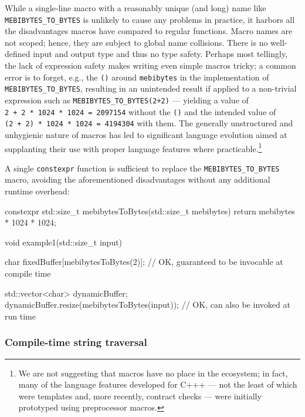 \noindent While a single-line macro with a reasonably unique (and long) name like
\lstinline!MEBIBYTES_TO_BYTES! is unlikely to cause any problems in
practice, it harbors all the disadvantages macros have compared to
regular functions. Macro names are not scoped; hence, they are subject
to global name collisions. There is no well-defined input and output
type and thus no type safety. Perhaps most tellingly, the lack of
expression safety makes writing even simple macros tricky; a common
error is to forget, e.g., the \lstinline!()! around \lstinline!mebibytes! in
the implementation of \lstinline!MEBIBYTES_TO_BYTES!, resulting in an
unintended result if applied to a non-trivial expression such as
\lstinline!MEBIBYTES_TO_BYTES(2+2)! --- yielding a value of
\lstinline!2!~\lstinline!+!~\lstinline!2!~\lstinline!*!~\lstinline!1024!~\lstinline!*!~\lstinline!1024!~\lstinline!=!~\lstinline!2097154!
without the \lstinline!()! and the intended value of
\lstinline!(2!~\lstinline!+!~\lstinline!2)!~\lstinline!*!~\lstinline!1024!~\lstinline!*!~\lstinline!1024!~\lstinline!=!~\lstinline!4194304!
with them. The generally unstructured and unhygienic nature of macros
has led to significant language evolution aimed at supplanting their use
with proper language features where practicable.{\cprotect\footnote{We
are not suggesting that macros have no place in the ecosystem; in
fact, many of the language features developed for C+++ --- not the
least of which were templates and, more recently, contract checks ---
  were initially prototyped using preprocessor macros.}}

A single \lstinline!constexpr! function is sufficient to replace the
\lstinline!MEBIBYTES_TO_BYTES! macro, avoiding the aforementioned
disadvantages without any additional runtime overhead:

\begin{emcppslisting}[emcppsbatch=e11]
constexpr std::size_t mebibytesToBytes(std::size_t mebibytes)
{
    return mebibytes * 1024 * 1024;
}

void example1(std::size_t input)
{
    char fixedBuffer[mebibytesToBytes(2)];
        // OK, guaranteed to be invocable at compile time

    std::vector<char> dynamicBuffer;
    dynamicBuffer.resize(mebibytesToBytes(input));
        // OK, can also be invoked at run time
}
\end{emcppslisting}
    

\subsubsection[Compile-time string traversal]{Compile-time string traversal}\label{compile-time-string-traversal}

